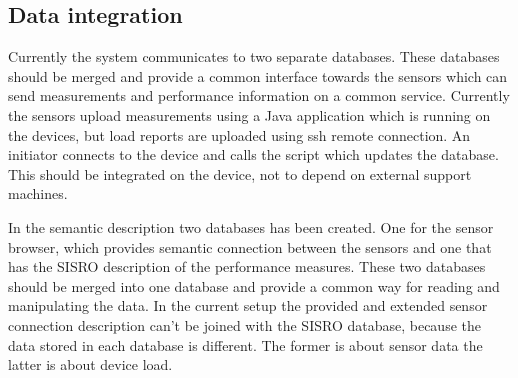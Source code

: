 \subsection{Data integration}

Currently the system communicates to two separate databases. These databases should be merged and provide a common interface towards the sensors which can send measurements and performance information on a common service. Currently the sensors upload measurements using a Java application which is running on the devices, but load reports are uploaded using ssh remote connection. An initiator connects to the device and calls the script which updates the database. This should be integrated on the device, not to depend on external support machines.

In the semantic description two databases has been created. One for the sensor browser, which provides semantic connection between the sensors and one that has the SISRO description of the performance measures. These two databases should be merged into one database and provide a common way for reading and manipulating the data. In the current setup the provided and extended sensor connection description can't be joined with the SISRO database, because the data stored in each database is different. The former is about sensor data the latter is about device load.




